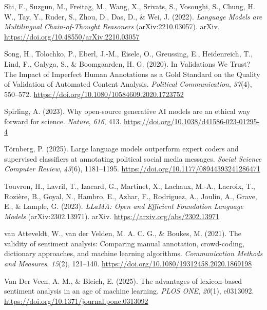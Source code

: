 \documentclass[
  man,
  floatsintext,
  longtable,
  nolmodern,
  notxfonts,
  notimes,
  colorlinks=true,linkcolor=blue,citecolor=blue,urlcolor=blue]{apa7}
\newlength{\cslhangindent}
\newenvironment{CSLReferences}[2] %
 {\begin{list}{}{%
  \setlength{\itemindent}{0pt}
  \setlength{\leftmargin}{0pt}
  \setlength{\parsep}{0pt}
  \ifodd #1
   \setlength{\leftmargin}{\cslhangindent}
   \setlength{\itemindent}{-1\cslhangindent}
  \fi
  \setlength{\itemsep}{#2\baselineskip}}}
 {\end{list}}
\begin{document}
\begin{CSLReferences}{1}{0}
Shi, F., Suzgun, M., Freitag, M., Wang, X., Srivats, S., Vosoughi, S.,
Chung, H. W., Tay, Y., Ruder, S., Zhou, D., Das, D., \& Wei, J. (2022).
\emph{Language {Models} are {Multilingual Chain-of-Thought Reasoners}}
(arXiv:2210.03057). arXiv.
\url{https://doi.org/10.48550/arXiv.2210.03057}

Song, H., Tolochko, P., Eberl, J.-M., Eisele, O., Greussing, E.,
Heidenreich, T., Lind, F., Galyga, S., \& Boomgaarden, H. G. (2020). In
{Validations We Trust}? {The Impact} of {Imperfect Human Annotations} as
a {Gold Standard} on the {Quality} of {Validation} of {Automated Content
Analysis}. \emph{Political Communication}, \emph{37}(4), 550--572.
\url{https://doi.org/10.1080/10584609.2020.1723752}

Spirling, A. (2023). Why open-source generative {AI} models are an
ethical way forward for science. \emph{Nature}, \emph{616}, 413.
\url{https://doi.org/10.1038/d41586-023-01295-4}

Törnberg, P. (2025). Large language models outperform expert coders and
supervised classifiers at annotating political social media messages.
\emph{Social Science Computer Review}, \emph{43}(6), 1181--1195.
\url{https://doi.org/10.1177/08944393241286471}

Touvron, H., Lavril, T., Izacard, G., Martinet, X., Lachaux, M.-A.,
Lacroix, T., Rozière, B., Goyal, N., Hambro, E., Azhar, F., Rodriguez,
A., Joulin, A., Grave, E., \& Lample, G. (2023). \emph{{LLaMA}: {Open}
and {Efficient Foundation Language Models}} (arXiv:2302.13971). arXiv.
\url{https://arxiv.org/abs/2302.13971}

van Atteveldt, W., van der Velden, M. A. C. G., \& Boukes, M. (2021).
The validity of sentiment analysis: Comparing manual annotation,
crowd-coding, dictionary approaches, and machine learning algorithms.
\emph{Communication Methods and Measures}, \emph{15}(2), 121--140.
\url{https://doi.org/10.1080/19312458.2020.1869198}

Van Der Veen, A. M., \& Bleich, E. (2025). The advantages of
lexicon-based sentiment analysis in an age of machine learning.
\emph{PLOS ONE}, \emph{20}(1), e0313092.
\url{https://doi.org/10.1371/journal.pone.0313092}


\end{CSLReferences}
\end{document}
